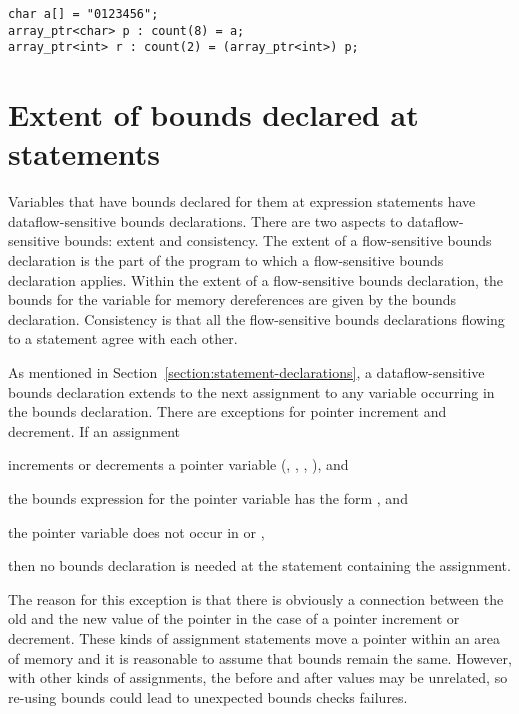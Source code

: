 \begin{lstlisting}
char a[] = "0123456";
array_ptr<char> p : count(8) = a;
array_ptr<int> r : count(2) = (array_ptr<int>) p;
\end{lstlisting}

\section{Extent of bounds declared at statements}
\label{section:extent-of-declarations}

Variables that have bounds declared for them at expression statements
have dataflow-sensitive bounds declarations. There are two aspects to
dataflow-sensitive bounds: extent and consistency. The extent of a
flow-sensitive bounds declaration is the part of the program to which 
a flow-sensitive bounds
declaration applies. Within the extent of a flow-sensitive 
bounds declaration, the
bounds for the variable for memory dereferences are given by the bounds
declaration. Consistency is that all the flow-sensitive bounds 
declarations flowing to a statement agree with each other.

As mentioned in Section~\ref{section:statement-declarations},
a dataflow-sensitive bounds declaration
extends to the next assignment to any variable occurring in the bounds
declaration. There are exceptions for pointer increment and decrement.
If an assignment

\begin{compactitem}
\item
  increments or decrements a pointer variable (\code{++},
  \code{--}, \code{+=}, \code{-=}), and
\item
  the bounds expression for the pointer variable has the form
  , and
\item
  the pointer variable does not occur in  or ,
\end{compactitem}

then no bounds declaration is needed at the statement containing the
assignment.

The reason for this exception is that there is obviously a connection
between the old and the new value of the pointer in the case of a
pointer increment or decrement. These kinds of assignment statements
move a pointer within an area of memory and it is reasonable to assume
that bounds remain the same. However, with other kinds of assignments,
the before and after values may be unrelated, so re-using bounds could
lead to unexpected bounds checks failures.

